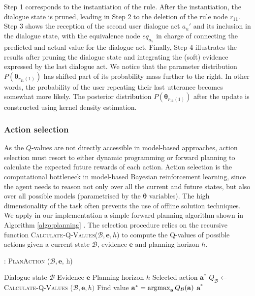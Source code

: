 Step 1 corresponds to the instantiation of the rule. After the instantiation, the dialogue state is pruned, leading in Step 2 to the deletion of the rule node $r_{11}$.  Step 3 shows the reception of the second user dialogue act $a_u'$ and its inclusion in the dialogue state, with the equivalence node $eq_{a_u}$ in charge of connecting the predicted and actual value for the dialogue act. Finally, Step 4 illustrates the results after pruning the dialogue state and integrating the (soft) evidence expressed by the last dialogue act. We notice that the parameter distribution $P(\boldsymbol\theta_{r_{11}(1)})$ has shifted part of its probability mass further to the right. In other words, the probability of the user repeating their last utterance becomes somewhat more likely. The posterior distribution $P(\boldsymbol\theta_{r_{11}(1)})$ after the update is constructed using kernel density estimation. 

\subsubsection*{Action selection}

 As the $Q$-values are not directly accessible in model-based approaches, action selection must resort to either dynamic programming or forward planning to calculate the expected future rewards of each action.  Action selection is the computational bottleneck in model-based Bayesian reinforcement learning, since the agent needs to reason not only over all the current and future states, but also over all possible models (parametrised by the $\boldsymbol\theta$ variables).  The high dimensionality of the task often prevents the use of offline solution techniques. We apply in our implementation a simple forward planning algorithm shown in Algorithm \ref{algo:planning} . The selection procedure relies on the recursive function \textsc{Calculate-Q-Values}($\mathcal{B}, \mathbf{e}, h$) to compute the Q-values of possible actions given a current state $\mathcal{B}$, evidence $\mathbf{e}$ and planning horizon $h$.  

\begin{algorithm}[h!]
\caption{: \textsc{PlanAction} ($\mathcal{B}, \mathbf{e}$, h) }
\begin{algorithmic}[1] \vspace{1mm}
\REQUIRE Dialogue state $\mathcal{B}$
\REQUIRE Evidence $\mathbf{e}$
\REQUIRE Planning horizon $h$
\ENSURE Selected action $\mathbf{a}^*$
\STATE $Q_{\mathcal{B}} \leftarrow $ \textsc{Calculate-Q-Values} ($\mathcal{B}, \mathbf{e}, h)$
\STATE Find value $\mathbf{a}^* = \argmax_{\mathbf{a}} Q_{\mathcal{B}}(\mathbf{a})$
\RETURN $\mathbf{a}^*$
\end{algorithmic}
\label{algo:planning}
\end{algorithm}


